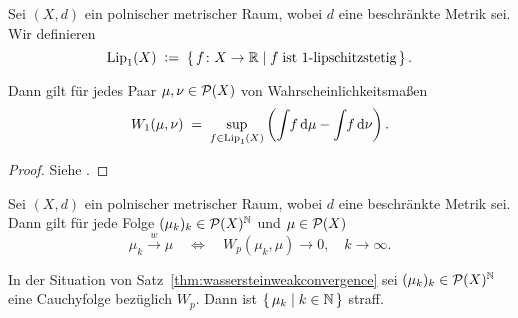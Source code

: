 \documentclass[../main/main.tex]{subfiles}
\begin{document}
	\begin{Satz}
		\label{thm:kantorovichrubinstein}
		Sei $(X, d)$ ein polnischer metrischer Raum, wobei $d$ eine beschränkte Metrik sei. Wir definieren
		\[ \mathrm{Lip}_1(X) \; \vcentcolon = \; \left\{\, f \colon X \to \mathbb{R} \; \middle| \; f \; \text{ist }1\text{-lipschitzstetig}  \,\right\} \text{.} \]
		
		Dann gilt für jedes Paar $\mu, \nu \in \mathcal{P}(X)$ von Wahrscheinlichkeitsmaßen
		\[ W_1(\mu, \nu) \; = \; \sup_{f \in \mathrm{Lip}_1(X)} \left( \int_{} \, f \, \mathrm{d}\mu - \int_{} \, f \, \mathrm{d}\nu \right) \text{.} \]
	\end{Satz}

	\begin{proof}
		Siehe \cite[Bemerkung 6.5]{Villani.2009}.
	\end{proof}

	\begin{Satz}
		\label{thm:wassersteinweakconvergence}
		Sei $(X, d)$ ein polnischer metrischer Raum, wobei $d$ eine beschränkte Metrik sei. Dann gilt
		für jede Folge $(\mu_k)_k \in \mathcal{P}(X)^{\mathbb{N}}$ und $\mu \in \mathcal{P}(X)$
		\[ \mu_k \xrightarrow{w} \mu \quad \iff \quad W_p(\mu_k, \mu) \to 0, \quad k \to \infty \text{.} \]
	\end{Satz}

	\begin{Hilfssatz}
		\label{lem:wassersteincauchyseq}
		In der Situation von Satz~\ref{thm:wassersteinweakconvergence} sei $(\mu_k)_k \in \mathcal{P}(X)^{\mathbb{N}}$ eine Cauchyfolge
		bezüglich $W_p$. Dann ist $\left\{\, \mu_k \; \middle| \; k \in \mathbb{N} \,\right\}$ straff.
	\end{Hilfssatz}
\end{document}
